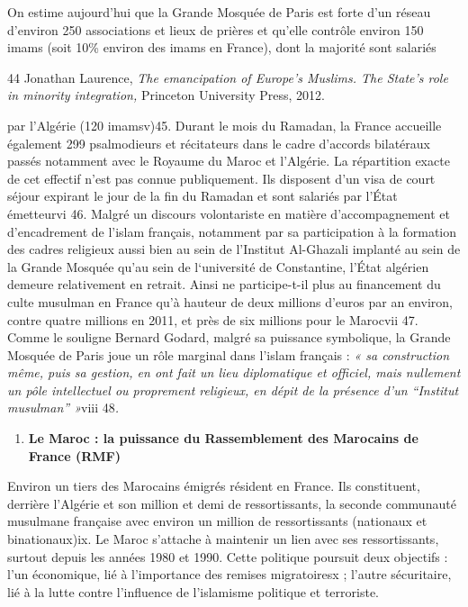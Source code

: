 On estime aujourd'hui que la Grande Mosquée de Paris est forte d'un
réseau d'environ 250 associations et lieux de prières et qu'elle
contrôle environ 150 imams (soit 10\% environ des imams en France), dont
la majorité sont salariés

44 Jonathan Laurence, \emph{The emancipation of Europe's Muslims. The
State's role in minority integration,} Princeton University Press, 2012.



par l'Algérie (120 imamsv)45. Durant le mois du Ramadan, la France
accueille également 299 psalmodieurs et récitateurs dans le cadre
d'accords bilatéraux passés notamment avec le Royaume du Maroc et
l'Algérie. La répartition exacte de cet effectif n'est pas connue
publiquement. Ils disposent d'un visa de court séjour expirant le jour
de la fin du Ramadan et sont salariés par l'État émetteurvi 46. Malgré
un discours volontariste en matière d'accompagnement et d'encadrement de
l'islam français, notamment par sa participation à la formation des
cadres religieux aussi bien au sein de l'Institut Al-Ghazali implanté au
sein de la Grande Mosquée qu'au sein de l`université de Constantine,
l'État algérien demeure relativement en retrait. Ainsi ne participe-t-il
plus au financement du culte musulman en France qu'à hauteur de deux
millions d'euros par an environ, contre quatre millions en 2011, et près
de six millions pour le Marocvii 47. Comme le souligne Bernard Godard,
malgré sa puissance symbolique, la Grande Mosquée de Paris joue un rôle
marginal dans l'islam français : \emph{« sa construction même, puis sa
gestion, en ont fait un lieu diplomatique et officiel, mais nullement un
pôle intellectuel ou proprement religieux, en dépit de la présence d'un
``Institut musulman'' »}viii 48\emph{.}


\begin{enumerate}
\def\labelenumi{\arabic{enumi}.}
\setcounter{enumi}{1}
\item
  \textbf{Le Maroc : la puissance du Rassemblement des Marocains de
  France (RMF)}
\end{enumerate}


Environ un tiers des Marocains émigrés résident en France. Ils
constituent, derrière l'Algérie et son million et demi de
ressortissants, la seconde communauté musulmane française avec environ
un million de ressortissants (nationaux et binationaux)ix. Le Maroc
s'attache à maintenir un lien avec ses ressortissants, surtout depuis
les années 1980 et 1990. Cette politique poursuit deux objectifs : l'un
économique, lié à l'importance des remises migratoiresx ; l'autre
sécuritaire, lié à la lutte contre l'influence de l'islamisme politique
et terroriste.

